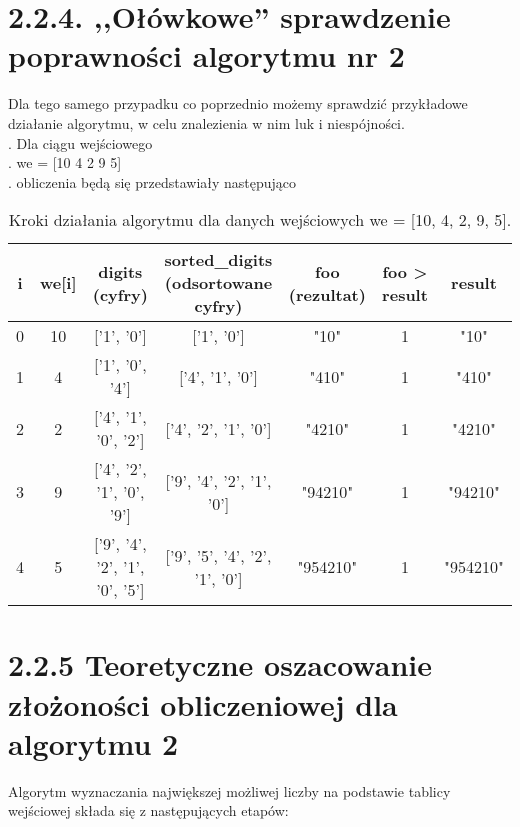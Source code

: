 \documentclass[a4paper,12pt]{article}
\begin{document}
	\section{2.2.4. ,,Ołówkowe” sprawdzenie poprawności algorytmu nr 2}
	Dla tego samego przypadku co poprzednio możemy sprawdzić przykładowe działanie algorytmu, w celu znalezienia w nim luk i niespójności. \\
	.    \hspace{1cm}Dla ciągu wejściowego \\
	.    \hspace{1cm}we = [10 4 2 9 5] \\
	.    \hspace{1cm}obliczenia będą się przedstawiały następująco \\
	\begin{table}[h!]
		\centering
		\footnotesize %
		\renewcommand{\arraystretch}{1.2} %
		\setlength{\tabcolsep}{2pt} %
		\begin{tabular}{|c|c|c|c|c|c|c|} 
			\hline
			\textbf{i} & \textbf{we[i]} & \textbf{digits (cyfry)} & \textbf{sorted\_digits (odsortowane cyfry)} & \textbf{foo (rezultat)} & \textbf{foo > result} & \textbf{result} \\
			\hline
			0 & 10 & ['1', '0'] & ['1', '0'] & "10" & 1 & "10" \\
			\hline
			1 & 4 & ['1', '0', '4'] & ['4', '1', '0'] & "410" & 1 & "410" \\
			\hline
			2 & 2 & ['4', '1', '0', '2'] & ['4', '2', '1', '0'] & "4210" & 1 & "4210" \\
			\hline
			3 & 9 & ['4', '2', '1', '0', '9'] & ['9', '4', '2', '1', '0'] & "94210" & 1 & "94210" \\
			\hline
			4 & 5 & ['9', '4', '2', '1', '0', '5'] & ['9', '5', '4', '2', '1', '0'] & "954210" & 1 & "954210" \\
			\hline
		\end{tabular}
		\caption{Kroki działania algorytmu dla danych wejściowych we = [10, 4, 2, 9, 5].}
		\label{tab:algorytm_example}
	\end{table}
	\section*{2.2.5 Teoretyczne oszacowanie złożoności obliczeniowej dla algorytmu 2}
	
	Algorytm wyznaczania największej możliwej liczby na podstawie tablicy wejściowej składa się z następujących etapów:
	
\end{document}
